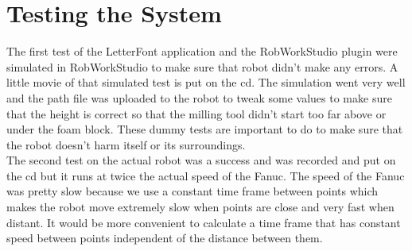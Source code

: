 \section{Testing the System}
\label{sec:test}

The first test of the LetterFont application and the RobWorkStudio plugin were simulated in RobWorkStudio to make sure that robot didn't make any errors. A little movie of that simulated test is put on the cd. The simulation went very well and the path file was uploaded to the robot to tweak some values to make sure that the height is correct so that the milling tool didn't start too far above or under the foam block. These dummy tests are important to do to make sure that the robot doesn't harm itself or its surroundings.
\\The second test on the actual robot was a success and was recorded and put on the cd but it runs at twice the actual speed of the Fanuc. The speed of the Fanuc was pretty slow because we use a constant time frame between points which makes the robot move extremely slow when points are close and very fast when distant. It would be more convenient to calculate a time frame that has constant speed between points independent of the distance between them.
